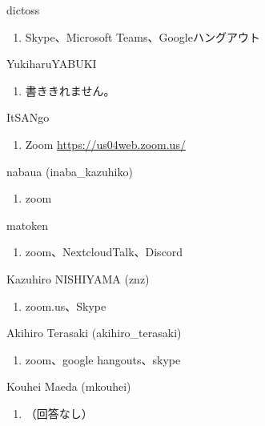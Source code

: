 \begin{prework}{ dictoss }
  \begin{enumerate}
  \item Skype、Microsoft Teams、Googleハングアウト
  \end{enumerate}
\end{prework}

\begin{prework}{ YukiharuYABUKI }
  \begin{enumerate}
  \item 書ききれません。
  \end{enumerate}
\end{prework}

\begin{prework}{ ItSANgo }
  \begin{enumerate}
  \item Zoom \url{https://us04web.zoom.us/}
  \end{enumerate}
\end{prework}

\begin{prework}{ nabaua (inaba\_kazuhiko) }
  \begin{enumerate}
  \item zoom
  \end{enumerate}
\end{prework}

\begin{prework}{ matoken }
  \begin{enumerate}
  \item zoom、NextcloudTalk、Discord
  \end{enumerate}
\end{prework}

\begin{prework}{ Kazuhiro NISHIYAMA (znz) }
  \begin{enumerate}
  \item zoom.us、Skype
  \end{enumerate}
\end{prework}

\begin{prework}{ Akihiro Terasaki (akihiro\_terasaki) }
  \begin{enumerate}
  \item zoom、google hangouts、skype
  \end{enumerate}
\end{prework}

\begin{prework}{ Kouhei Maeda (mkouhei) }
  \begin{enumerate}
  \item （回答なし）
  \end{enumerate}
\end{prework}

